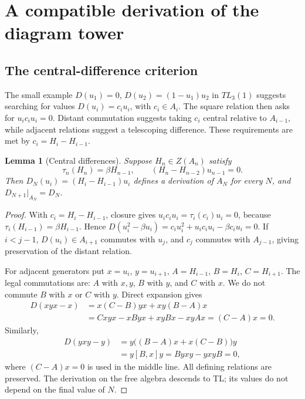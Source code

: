 \documentclass[a4paper,11pt,oneside,reqno]{amsart}
\newtheorem{lemma}[theorem]{Lemma}
\theoremstyle{definition}
\numberwithin{equation}{section}
\begin{document}
	\section{A compatible derivation of the diagram tower}\label{tl:derivation}
	\subsection{The central-difference criterion}
	The small example $D(u_1)=0$, $D(u_2)=(1-u_1)u_2$ in $TL_3(1)$
	suggests searching for values $D(u_i)=c_iu_i$, with $c_i\in A_i$.
	The square relation then asks for $u_ic_iu_i=0$.  Distant
	commutation suggests taking $c_i$ central relative to $A_{i-1}$,
	while adjacent relations suggest a telescoping difference.
	These requirements are met by $c_i=H_i-H_{i-1}$.
	
	\begin{lemma}[Central differences]\label{tl:central-differences}
		Suppose $H_n\in Z(A_n)$ satisfy
		\begin{equation}\label{tl:H-conditions}
			\tau_n(H_n)=\beta H_{n-1},\qquad
			(H_n-H_{n-2})u_{n-1}=0.
		\end{equation}
		Then $D_N(u_i)=(H_i-H_{i-1})u_i$ defines a derivation of $A_N$
		for every $N$, and $D_{N+1}|_{A_N}=D_N$.
	\end{lemma}
	\begin{proof}
		With $c_i=H_i-H_{i-1}$, closure gives
		$u_ic_iu_i=\tau_i(c_i)u_i=0$, because
		$\tau_i(H_{i-1})=\beta H_{i-1}$.  Hence
		$D(u_i^2-\beta u_i)=c_iu_i^2+u_ic_iu_i-\beta c_iu_i=0$.
		If $i<j-1$, $D(u_i)\in A_{i+1}$ commutes with $u_j$, and $c_j$
		commutes with $A_{j-1}$, giving preservation of the distant relation.
		
		For adjacent generators put $x=u_i$, $y=u_{i+1}$,
		$A=H_{i-1}$, $B=H_i$, $C=H_{i+1}$.  The legal commutations are:
		$A$ with $x,y$, $B$ with $y$, and $C$ with $x$.  We do not commute
		$B$ with $x$ or $C$ with $y$.  Direct expansion gives
		\[
		\begin{aligned}
			D(xyx-x)
			&=x(C-B)yx+xy(B-A)x\\
			&=Cxyx-xByx+xyBx-xyAx=(C-A)x=0.
		\end{aligned}
		\]
		Similarly,
		\[
		\begin{aligned}
			D(yxy-y)&=y\bigl((B-A)x+x(C-B)\bigr)y\\
			&=y[B,x]y=Byxy-yxyB=0,
		\end{aligned}
		\]
		where $(C-A)x=0$ is used in the middle line.  All defining relations
		are preserved.  The derivation on the free algebra descends to TL;
		its values do not depend on the final value of $N$.
	\end{proof}
	
\end{document}
